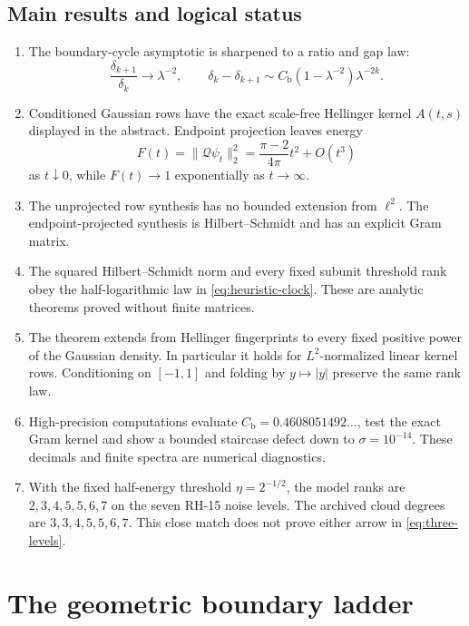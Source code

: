 \documentclass[11pt]{article}
\theoremstyle{definition}
\theoremstyle{remark}
\newcommand{\cQ}{\mathcal Q}
\begin{document}
\subsection*{Main results and logical status}

\begin{enumerate}[label=\textbf{R\arabic*.},leftmargin=3.2em]
 \item The boundary-cycle asymptotic is sharpened to a ratio and gap law:
 \[
  \frac{\delta_{k+1}}{\delta_k}\to\lambda^{-2},
  \qquad
  \delta_k-\delta_{k+1}
  \sim C_{\mathrm b}(1-\lambda^{-2})\lambda^{-2k}.
 \]

 \item Conditioned Gaussian rows have the exact scale-free Hellinger kernel
 $A(t,s)$ displayed in the abstract.  Endpoint projection leaves energy
 \[
  F(t)=\|\cQ\psi_t\|_2^2
  =\frac{\pi-2}{4\pi}t^2+O(t^3)
 \]
 as $t\downarrow0$, while $F(t)\to1$ exponentially as $t\to\infty$.

 \item The unprojected row synthesis has no bounded extension from
 $\ell^2$.  The endpoint-projected synthesis is Hilbert--Schmidt and has an
 explicit Gram matrix.

 \item The squared Hilbert--Schmidt norm and every fixed subunit threshold
 rank obey the half-logarithmic law in \eqref{eq:heuristic-clock}.  These are
 analytic theorems proved without finite matrices.

 \item The theorem extends from Hellinger fingerprints to every fixed positive
 power of the Gaussian density.  In particular it holds for
 $L^2$-normalized linear kernel rows.  Conditioning on $[-1,1]$ and folding
 by $y\mapsto|y|$ preserve the same rank law.

 \item High-precision computations evaluate
 $C_{\mathrm b}=0.4608051492\ldots$, test the exact Gram kernel and show a
 bounded staircase defect down to $\sigma=10^{-14}$.  These decimals and
 finite spectra are numerical diagnostics.

 \item With the fixed half-energy threshold $\eta=2^{-1/2}$, the model ranks
 are $2,3,4,5,5,6,7$ on the seven RH-15 noise levels.  The archived cloud
 degrees are $3,3,4,5,5,6,7$.  This close match does not prove either arrow
 in \eqref{eq:three-levels}.
\end{enumerate}

\section{The geometric boundary ladder}
\label{sec:boundary-ladder}
\end{document}
